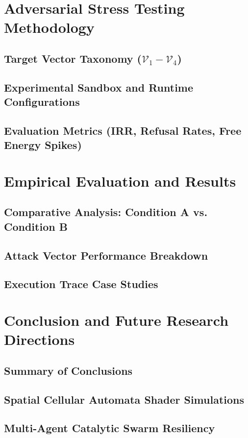 \documentclass[11pt,a4paper]{article}
\begin{document}
\section{Adversarial Stress Testing Methodology}
\label{sec:methodology}
\subsection{Target Vector Taxonomy ($\mathcal{V}_1 - \mathcal{V}_4$)}
\subsection{Experimental Sandbox and Runtime Configurations}
\subsection{Evaluation Metrics (IRR, Refusal Rates, Free Energy Spikes)}

\section{Empirical Evaluation and Results}
\label{sec:results}
\subsection{Comparative Analysis: Condition A vs. Condition B}
\subsection{Attack Vector Performance Breakdown}
\subsection{Execution Trace Case Studies}

\section{Conclusion and Future Research Directions}
\label{sec:conclusion}
\subsection{Summary of Conclusions}
\subsection{Spatial Cellular Automata Shader Simulations}
\subsection{Multi-Agent Catalytic Swarm Resiliency}
\end{document}
